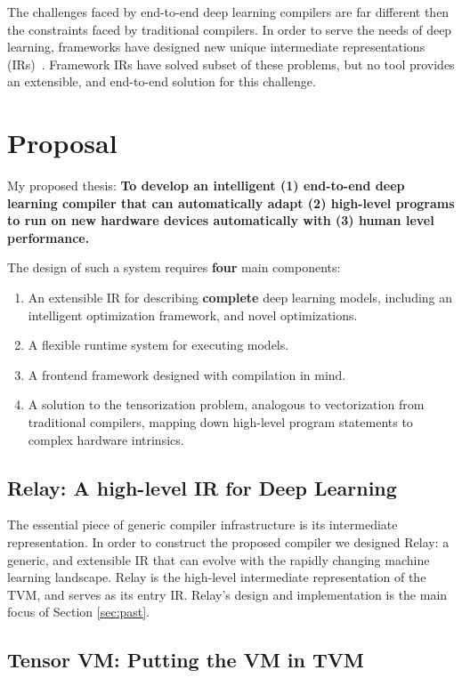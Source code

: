 The challenges faced by end-to-end deep learning compilers are far
  different then the constraints faced by traditional compilers.
In order to serve the needs of deep learning, frameworks have designed new
  unique intermediate representations (IRs)~\citep{tensorflow, pytorch_ad, chainer_learningsys2015, tangent, theano, glow}.
Framework IRs have solved subset of these problems,
  but no tool provides an extensible,
  and end-to-end solution for this challenge.

\section{Proposal}

My proposed thesis: \textbf{To develop an intelligent (1) end-to-end deep learning compiler that can
automatically adapt (2) high-level programs to run on new hardware devices automatically
with (3) human level performance.}

The design of such a system requires \textbf{four} main components:
\begin{enumerate}
  \item An extensible IR for describing \textbf{complete} deep learning models,
        including an intelligent optimization framework, and novel optimizations.
  \item A flexible runtime system for executing models.
  \item A frontend framework designed with compilation in mind.
  \item A solution to the tensorization problem, analogous to vectorization from traditional
        compilers, mapping down high-level program statements to complex hardware intrinsics.
\end{enumerate}

\subsection{Relay: A high-level IR for Deep Learning}

The essential piece of generic compiler infrastructure is
  its intermediate representation.
In order to construct the proposed compiler we designed Relay: a generic, and
  extensible IR that can evolve with the rapidly changing
  machine learning landscape.
Relay is the high-level intermediate representation of the TVM,
  and serves as its entry IR.
Relay's design and implementation is the main focus of Section \ref{sec:past}.

\subsection{Tensor VM: Putting the VM in TVM}

